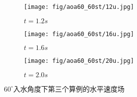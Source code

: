 \begin{figure}[!htp]
  \quad 

  \begin{subfigure}{0.25\textwidth}
    \centering
    \texttt{[image: fig/aoa60\_60st/12u.jpg]}
    \caption{$t = 1.2s$}
  \end{subfigure}
  \hspace{1cm}
  \begin{subfigure}{0.25\textwidth}
    \centering
    \texttt{[image: fig/aoa60\_60st/16u.jpg]}
    \caption{$t = 1.6s$}
  \end{subfigure}
  \hspace{1cm}
  \begin{subfigure}{0.25\textwidth}
    \centering
    \texttt{[image: fig/aoa60\_60st/20u.jpg]}
    \caption{$t = 2.0s$}
  \end{subfigure}

  \caption{$60^\circ$入水角度下第三个算例的水平速度场}
  \label{fig:detail_u}
\end{figure}
